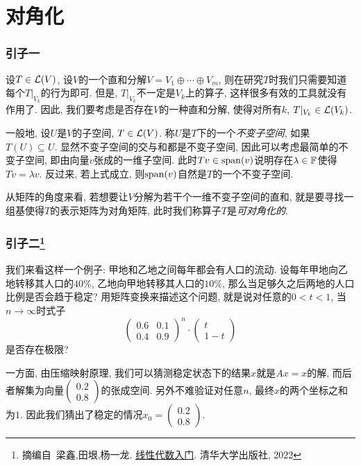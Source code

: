 \chapter{对角化}

\subsection*{引子一}

设$T \in \mathcal{L} (V)$, 设$V$的一个直和分解$V=V_1 \oplus \cdots \oplus V_m$, 则在研究$T$时我们只需要知道每个$T|_{V_k}$的行为即可. 但是, $T|_{V_k}$不一定是$V_k$上的算子, 这样很多有效的工具就没有作用了. 因此, 我们要考虑是否存在$V$的一种直和分解, 使得对所有$k$, $T|_{V_k} \in \mathcal{L} (V_k)$. 

一般地, 设$U$是$V$的子空间, $T\in \mathcal{L} (V)$. 称$U$是$T$下的一个\textit{不变子空间}, 如果$T(U) \subseteq U$. 显然不变子空间的交与和都是不变子空间, 因此可以考虑最简单的不变子空间, 即由向量$v$张成的一维子空间. 此时$Tv \in \operatorname{span} (v)$说明存在$\lambda \in \mathbb{F}$使得$Tv=\lambda v$. 反过来, 若上式成立, 则$\operatorname{span} (v)$自然是$T$的一个不变子空间. 

从矩阵的角度来看, 若想要让$V$分解为若干个一维不变子空间的直和, 就是要寻找一组基使得$T$的表示矩阵为对角矩阵, 此时我们称算子$T$是\textit{可对角化的}. 

\subsection*{引子二\footnote{摘编自~梁鑫,田垠,杨一龙. \underline{线性代数入门}. 清华大学出版社, 2022}}

我们来看这样一个例子: 甲地和乙地之间每年都会有人口的流动. 设每年甲地向乙地转移其人口的$40 \%$, 乙地向甲地转移其人口的$10 \%$, 那么当足够久之后两地的人口比例是否会趋于稳定? 用矩阵变换来描述这个问题, 就是说对任意的$0<t<1$, 当$n\to \infty$时式子$$
\begin{pmatrix}
 0.6 & 0.1\\
 0.4 & 0.9
\end{pmatrix}^n \cdot \begin{pmatrix}
t \\
1-t
\end{pmatrix}$$
是否存在极限? 

一方面, 由压缩映射原理, 我们可以猜测稳定状态下的结果$x$就是$Ax=x$的解, 而后者解集为向量$\begin{pmatrix}
0.2 \\ 0.8
\end{pmatrix}$的张成空间. 另外不难验证对任意$n$, 最终$x$的两个坐标之和为$1$. 因此我们猜出了稳定的情况$x_0=\begin{pmatrix}
0.2 \\ 0.8
\end{pmatrix}$. 


